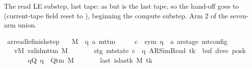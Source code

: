 \begin{isabellebody}
%
\isadelimproof
%
\endisadelimproof
%
\begin{isamarkuptext}%
The read LE substep, last tape: as  but
   is the last tape, so the hand-off goes to
   (current-tape field reset to ),
  beginning the compute substep.  Arm 2 of the seven-arm
   union.%
\end{isamarkuptext}\isamarkuptrue%
\isamarkupfalse%
\ ar{\isacharunderscore}{\kern0pt}read{\isacharunderscore}{\kern0pt}le{\isacharunderscore}{\kern0pt}finish{\isacharunderscore}{\kern0pt}step{\isacharcolon}{\kern0pt}\isanewline
\ \ \ M\ {\isacharcolon}{\kern0pt}{\isacharcolon}{\kern0pt}\ {\isachardoublequoteopen}{\isacharparenleft}{\kern0pt}{\isacharprime}{\kern0pt}q{\isacharcomma}{\kern0pt}\ {\isacharprime}{\kern0pt}a{\isacharparenright}{\kern0pt}\ mttm{\isachardoublequoteclose}\isanewline
\ \ \ \ \ c{\isacharprime}{\kern0pt}\ {\isacharcolon}{\kern0pt}{\isacharcolon}{\kern0pt}\ {\isachardoublequoteopen}{\isacharparenleft}{\kern0pt}sym{}{\isacharcomma}{\kern0pt}\ {\isacharprime}{\kern0pt}q\ {\isasymtimes}\ {\isacharprime}{\kern0pt}a\ ar{\isacharunderscore}{\kern0pt}stage{\isacharparenright}{\kern0pt}\ mt{\isacharunderscore}{\kern0pt}config{\isachardoublequoteclose}\isanewline
\ \ \ vM{\isacharcolon}{\kern0pt}\ {\isachardoublequoteopen}valid{\isacharunderscore}{\kern0pt}mttm\ M{\isachardoublequoteclose}\isanewline
\ \ \ \ \ \ \ stg{\isacharcolon}{\kern0pt}\ {\isachardoublequoteopen}mt{\isacharunderscore}{\kern0pt}state\ c{\isacharprime}{\kern0pt}\ {\isacharequal}{\kern0pt}\ {\isacharparenleft}{\kern0pt}q{\isacharcomma}{\kern0pt}\ AR{\isacharunderscore}{\kern0pt}SimRead{\isacharcomma}{\kern0pt}\ tk{\isacharcomma}{\kern0pt}\ {}{\isacharcomma}{\kern0pt}\ buf{\isacharcomma}{\kern0pt}\ dvec{\isacharcomma}{\kern0pt}\ posk{\isacharparenright}{\kern0pt}{\isachardoublequoteclose}\isanewline
\ \ \ \ \ \ \ qQ{\isacharcolon}{\kern0pt}\ {\isachardoublequoteopen}q\ {\isasymin}\ Q{\isacharunderscore}{\kern0pt}tm\ M{\isachardoublequoteclose}\isanewline
\ \ \ \ \ \ \ last{\isacharcolon}{\kern0pt}\ {\isachardoublequoteopen}is{\isacharunderscore}{\kern0pt}last{\isacharunderscore}{\kern0pt}k\ M\ tk{\isachardoublequoteclose}\isanewline

\end{isabellebody}

